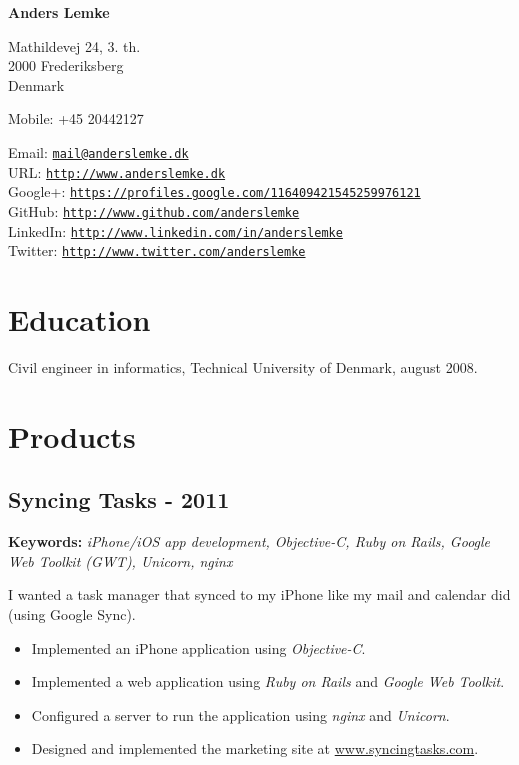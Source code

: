 \documentclass[a4paper]{article}
\newcommand{\keywords}[1]{\small\textbf{Keywords:} \emph{#1}\normalsize}
\begin{document}
{\huge\bf Anders Lemke}

\bigskip
Mathildevej 24, 3. th. \\
2000 Frederiksberg \\
Denmark

\medskip

Mobile: +45 20442127 

\medskip

Email: \href{mailto:mail@anderslemke.dk}{\tt mail@anderslemke.dk} \\
URL: \href{http://www.anderslemke.dk}{\tt http://www.anderslemke.dk} \\
Google+: \href{https://profiles.google.com/116409421545259976121}{\tt https://profiles.google.com/116409421545259976121} \\
GitHub: \href{http://www.github.com/anderslemke}{\tt http://www.github.com/anderslemke} \\
LinkedIn: \href{http://www.linkedin.com/in/anderslemke}{\tt http://www.linkedin.com/in/anderslemke} \\
Twitter: \href{http://www.twitter.com/anderslemke}{\tt http://www.twitter.com/anderslemke} 

\section*{Education}
Civil engineer in informatics, Technical University of Denmark, august 2008.

\section*{Products}
\subsection*{Syncing Tasks - 2011}
\keywords{iPhone/iOS app development, Objective-C, Ruby on Rails, Google Web Toolkit (GWT), Unicorn, nginx}

I wanted a task manager that synced to my iPhone like my mail and calendar did (using Google Sync).

\begin{itemize}
\item Implemented an iPhone application using \emph{Objective-C}.
\item Implemented a web application using \emph{Ruby on Rails} and \emph{Google Web Toolkit}.
\item Configured a server to run the application using \emph{nginx} and \emph{Unicorn}.
\item Designed and implemented the marketing site at \href{http://www.syncingtasks.com}{www.syncingtasks.com}.
\end{itemize}
\end{document}
